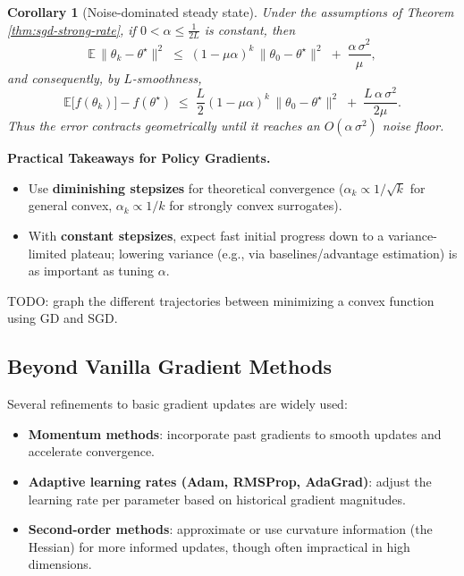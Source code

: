 \documentclass[
]{book}
\providecommand{\tightlist}{%
  \setlength{\itemsep}{0pt}\setlength{\parskip}{0pt}}
\newtheorem{corollary}{Corollary}[chapter]
\theoremstyle{definition}
\theoremstyle{definition}
\theoremstyle{definition}
\theoremstyle{definition}
\theoremstyle{remark}
\begin{document}
\begin{corollary}[Noise-dominated steady state]
\protect\hypertarget{cor:sgd-const-steps}{}\label{cor:sgd-const-steps}Under the assumptions of Theorem \ref{thm:sgd-strong-rate}, if \(0<\alpha \le \frac{1}{2L}\) is constant, then
\[
\mathbb{E}\,\|\theta_k-\theta^\star\|^2
\;\le\;
(1-\mu\alpha)^k\,\|\theta_0-\theta^\star\|^2
\;+\;
\frac{\alpha\,\sigma^2}{\mu},
\]
and consequently, by \(L\)-smoothness,
\[
\mathbb{E}\big[f(\theta_k)\big]-f(\theta^\star)
\;\le\;
\frac{L}{2}(1-\mu\alpha)^k\,\|\theta_0-\theta^\star\|^2
\;+\;
\frac{L\,\alpha\,\sigma^2}{2\mu}.
\]
Thus the error contracts geometrically until it reaches an \(O(\alpha\,\sigma^2)\) noise floor.
\end{corollary}

\textbf{Practical Takeaways for Policy Gradients.}

\begin{itemize}
\item
  Use \textbf{diminishing stepsizes} for theoretical convergence (\(\alpha_k \propto 1/\sqrt{k}\) for general convex, \(\alpha_k \propto 1/k\) for strongly convex surrogates).
\item
  With \textbf{constant stepsizes}, expect fast initial progress down to a variance-limited plateau; lowering variance (e.g., via baselines/advantage estimation) is as important as tuning \(\alpha\).
\end{itemize}

{TODO: graph the different trajectories between minimizing a convex function using GD and SGD.}

\subsection{Beyond Vanilla Gradient Methods}\label{beyond-vanilla-gradient-methods}

Several refinements to basic gradient updates are widely used:

\begin{itemize}
\tightlist
\item
  \textbf{Momentum methods}: incorporate past gradients to smooth updates and accelerate convergence.
\item
  \textbf{Adaptive learning rates (Adam, RMSProp, AdaGrad)}: adjust the learning rate per parameter based on historical gradient magnitudes.
\item
  \textbf{Second-order methods}: approximate or use curvature information (the Hessian) for more informed updates, though often impractical in high dimensions.
\end{itemize}
\end{document}
